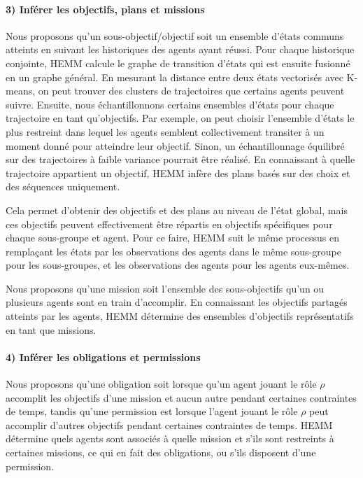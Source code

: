 \documentclass[sigconf,anonymous]{aamas}
\begin{document}
\paragraph{\textbf{3) Inférer les objectifs, plans et missions}}

Nous proposons qu'un sous-objectif/objectif soit un ensemble d'états communs atteints en suivant les historiques des agents ayant réussi.
Pour chaque historique conjointe, HEMM calcule le graphe de transition d'états qui est ensuite fusionné en un graphe général. En mesurant la distance entre deux états vectorisés avec K-means, on peut trouver des clusters de trajectoires que certains agents peuvent suivre. Ensuite, nous échantillonnons certains ensembles d'états pour chaque trajectoire en tant qu'objectifs. Par exemple, on peut choisir l'ensemble d'états le plus restreint dans lequel les agents semblent collectivement transiter à un moment donné pour atteindre leur objectif. Sinon, un échantillonnage équilibré sur des trajectoires à faible variance pourrait être réalisé. En connaissant à quelle trajectoire appartient un objectif, HEMM infère des plans basés sur des choix et des séquences uniquement.

Cela permet d'obtenir des objectifs et des plans au niveau de l'état global, mais ces objectifs peuvent effectivement être répartis en objectifs spécifiques pour chaque sous-groupe et agent. Pour ce faire, HEMM suit le même processus en remplaçant les états par les observations des agents dans le même sous-groupe pour les sous-groupes, et les observations des agents pour les agents eux-mêmes.

Nous proposons qu'une mission soit l'ensemble des sous-objectifs qu'un ou plusieurs agents sont en train d'accomplir.
En connaissant les objectifs partagés atteints par les agents, HEMM détermine des ensembles d'objectifs représentatifs en tant que missions.

\paragraph{\textbf{4) Inférer les obligations et permissions}}

Nous proposons qu'une obligation soit lorsque qu'un agent jouant le rôle $\rho$ accomplit les objectifs d'une mission et aucun autre pendant certaines contraintes de temps, tandis qu'une permission est lorsque l'agent jouant le rôle $\rho$ peut accomplir d'autres objectifs pendant certaines contraintes de temps.
HEMM détermine quels agents sont associés à quelle mission et s'ils sont restreints à certaines missions, ce qui en fait des obligations, ou s'ils disposent d'une permission.
\end{document}
